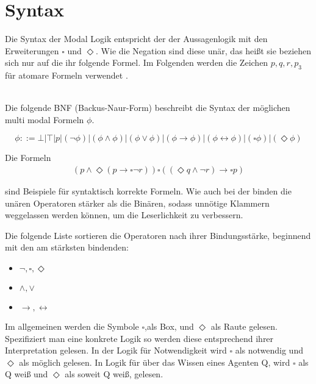 
\section{Syntax} %
\label{sec:syntax}
Die Syntax der Modal Logik entspricht der der Aussagenlogik mit den Erweiterungen $\square$ und $\Diamond$. 
Wie die Negation sind diese unär, das heißt sie beziehen sich nur auf die ihr folgende Formel. Im Folgenden werden die Zeichen $p, q, r, p_3$ für atomare Formeln verwendet .\\
\\
\begin{definition}
	\label{def:syntax}
	Die folgende BNF (Backus-Naur-Form) beschreibt die Syntax der möglichen multi modal Formeln $\phi$.

	\begin{equation}
		\label{eqn:bnf}
		\phi ::= \bot|\top|p|(\neg\phi)|(\phi\wedge\phi)|(\phi\vee\phi)|(\phi\rightarrow\phi)|
		(\phi\leftrightarrow\phi)|(\square\phi)|(\Diamond\phi)
	\end{equation}
\end{definition}

Die Formeln 
\begin{align}
	(p \wedge \Diamond(p \rightarrow \square \neg r))
	\square((\Diamond q \wedge \neg r) \rightarrow \square p )	
\end{align} 

sind Beispiele für syntaktisch korrekte \MML Formeln. 
Wie auch bei der \AL binden die unären Operatoren stärker als die Binären, sodass unnötige Klammern weggelassen werden können, um die Leserlichkeit zu verbessern.


Die folgende Liste sortieren die Operatoren nach ihrer Bindungsstärke, beginnend mit den am stärksten bindenden:\\
\label{bindungsstaerke}
\begin{itemize}
	\item $\neg, \square, \Diamond$
	\item $\wedge, \vee$
	\item $\rightarrow, \leftrightarrow$
\end{itemize}

Im allgemeinen werden die Symbole $\square$,als Box, und $\Diamond$ als Raute gelesen. 
Spezifiziert man eine konkrete Logik so werden diese entsprechend ihrer Interpretation gelesen. 
In der Logik für Notwendigkeit wird $\square$ als notwendig und $\Diamond$ als möglich gelesen. 
In Logik für über das Wissen eines Agenten Q, wird $\square$ als Q weiß und $\Diamond$ als soweit Q weiß, gelesen.


